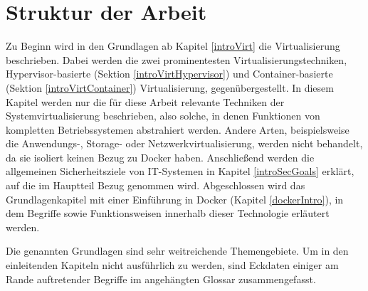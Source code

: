 \documentclass[../main.tex]{subfiles}
\begin{document}

  \section{Struktur der Arbeit}
    Zu Beginn wird in den Grundlagen ab Kapitel \ref{introVirt} die Virtualisierung beschrieben. Dabei werden die zwei prominentesten Virtualisierungstechniken, Hypervisor-basierte (Sektion \ref{introVirtHypervisor}) und Container-basierte (Sektion \ref{introVirtContainer}) Virtualisierung, gegenübergestellt. In diesem Kapitel werden nur die für diese Arbeit relevante Techniken der Systemvirtualisierung beschrieben, also solche, in denen Funktionen von kompletten Betriebssystemen abstrahiert werden. Andere Arten, beispielsweise die Anwendungs-, Storage- oder Netzwerkvirtualisierung, werden nicht behandelt, da sie isoliert keinen Bezug zu Docker haben. Anschließend werden die allgemeinen Sicherheitsziele von \acrshort{IT}-Systemen in Kapitel \ref{introSecGoals} erklärt, auf die im Hauptteil Bezug genommen wird. Abgeschlossen wird das Grundlagenkapitel mit einer Einführung in Docker (Kapitel \ref{dockerIntro}), in dem Begriffe sowie Funktionsweisen innerhalb dieser Technologie erläutert werden.

    Die genannten Grundlagen sind sehr weitreichende Themengebiete. Um in den einleitenden Kapiteln nicht ausführlich zu werden, sind Eckdaten einiger am Rande auftretender Begriffe im angehängten Glossar zusammengefasst.
\end{document}
